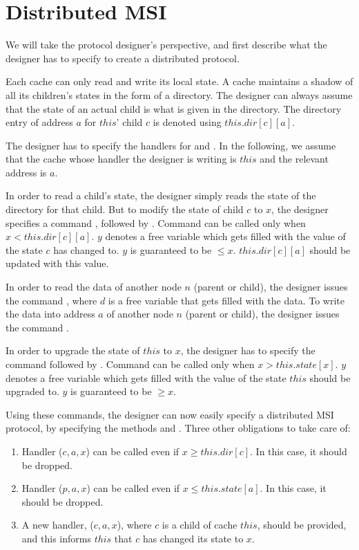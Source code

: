\section{Distributed MSI}
\label{sec:DistributedMsi}

We will take the protocol designer's perspective, and first describe what the
designer has to specify to create a distributed protocol.

Each cache can only read and write its local state. A cache maintains a shadow
 of all its children's states in the form of a directory. The designer can
always assume that the state of an actual child is what is given in the
directory. The directory entry of address $a$ for $this$' child $c$ is denoted
using $this.dir[c][a]$.

The designer has to specify the handlers for \uReq{} and \dReq{}. In the
following, we assume that the cache whose handler the designer is writing is
$this$ and the relevant address is $a$.

In order to read a child's state, the designer simply reads the state of the
directory for that child. But to modify the state of child $c$ to $x$, the
designer specifies a command \send{} , followed by \receive{}
. Command \send{}  can be called only when $x
< this.dir[c][a]$. $y$ denotes a free variable which gets filled with the value of
the state $c$ has changed to. $y$ is guaranteed to be $\le x$. $this.dir[c][a]$
should be updated with this value.

In order to read the data of another node $n$ (parent or child),
the designer issues the command \receive{} , where $d$ is a free
variable that gets filled with the data. To write the data into address $a$ of
another node $n$ (parent or child), the designer issues the command \send{}
.

In order to upgrade the state of $this$ to $x$, the designer has to
specify the command \send{}  followed by \receive{}
. Command \send{}  can be called only when $x
> this.state[x]$. $y$ denotes a free variable which gets filled with the value of
the state $this$ should be upgraded to. $y$ is guaranteed to be $\ge x$.

Using these commands, the designer can now easily specify a distributed MSI
protocol, by specifying the methods \uReq{} and \dReq{}. Three other
obligations to take care of:
\begin{enumerate}
\item Handler \uReq{}($c, a, x$) can be called even if $x \ge
this.dir[c]$. In this case, it should be dropped.
\item Handler \dReq{}($p, a, x$) can be called even if $x \le
this.state[a]$. In this case, it should be dropped.
\item A new handler, \dRespL{}($c, a, x$), where $c$ is a child of cache $this$,
should be provided, and this informs $this$ that $c$ has changed its state to
$x$.
\end{enumerate}

